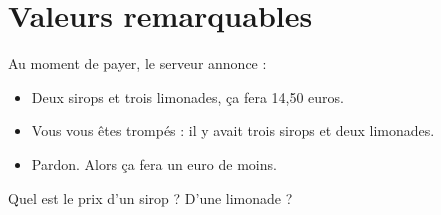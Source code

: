 \documentclass[15pt,smaller,aspectratio=169,xcolor={usenames,dvipsnames}]{beamer}
\begin{document}
\section{Valeurs remarquables}


\begin{frame}[label=pagesimple]


    Au moment de payer, le serveur annonce :
    \begin{itemize}
      \item Deux sirops et trois limonades, ça fera 14,50 euros.
      \item Vous vous êtes trompés : il y avait trois sirops et deux limonades.
      \item Pardon. Alors ça fera un euro de moins.
    \end{itemize}

    Quel est le prix d'un sirop ? D'une limonade ?

\end{frame}
\end{document}
